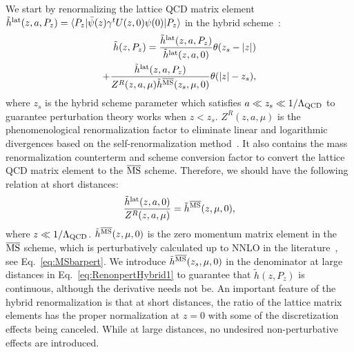 \documentclass[prd,aps,twocolumn,preprintnumbers, showpacs, nofootinbib,superscriptaddress,notitlepage]{revtex4-2}
\def\bea{\begin{eqnarray}}
\def\eea{\end{eqnarray}}
\begin{document}
We start by renormalizing the lattice QCD matrix element $\tilde{h}^{\rm lat}(z, a, P_{z})=\langle P_z| \bar{\psi}(z) \gamma^{t} U(z,0) \psi (0) |P_z \rangle$ in the hybrid scheme~\cite{Ji:2020brr}:
\bea\label{eq:RenonpertHybrid1}
\tilde{h}(z, P_{z}) = \frac{\tilde{h}^{\rm lat}(z, a, P_{z})}{\tilde{h}^{\rm lat}(z, a, 0)}\theta(z_{s}-|z|) \nonumber\\
+ \frac{\tilde{h}^{\rm lat}(z, a, P_{z})}{Z^{R}(z,a,\mu) \tilde{h}^{\overline{\rm MS}}(z_{s}, \mu, 0)}\theta(|z|-z_{s}), 
\eea
where $z_{s}$ is the hybrid scheme parameter which satisfies $a \ll z_s \ll 1/\Lambda_{\rm QCD}$ to guarantee perturbation theory works when $z<z_s$.  $Z^{R}(z,a,\mu)$ is the phenomenological renormalization factor to eliminate linear and logarithmic divergences based on the self-renormalization method~\cite{LatticePartonCollaborationLPC:2021xdx}. It also contains the mass renormalization counterterm and scheme conversion factor to convert the lattice QCD matrix element to the $\overline{\rm MS}$ scheme. Therefore, we should have the following relation at short distances:
$$\frac{\tilde{h}^{\rm lat}(z, a, 0)}{Z^{R}(z,a,\mu)}=\tilde{h}^{\overline{\rm MS}}(z, \mu, 0),$$
where $z \ll 1/\Lambda_{\rm QCD}$. $\tilde{h}^{\overline{\rm MS}}(z, \mu, 0)$ is the zero momentum matrix element in the $\overline{\rm MS}$ scheme, which is perturbatively calculated up to NNLO in the literature~\cite{Li:2020xml}, see Eq.~\eqref{eq:MSbarpert}. We introduce $\tilde{h}^{\overline{\rm MS}}(z_{s}, \mu, 0)$ in the denominator at large distances in Eq.~\eqref{eq:RenonpertHybrid1} to guarantee that $\tilde{h}(z, P_z)$ is continuous,
although the derivative needs not be. An important feature of the hybrid renormalization is that at short distances, the ratio of
the lattice matrix elements has the proper normalization at $z=0$ with some of the discretization effects being canceled. While at large distances, no undesired non-perturbative effects are introduced. 
\end{document}
